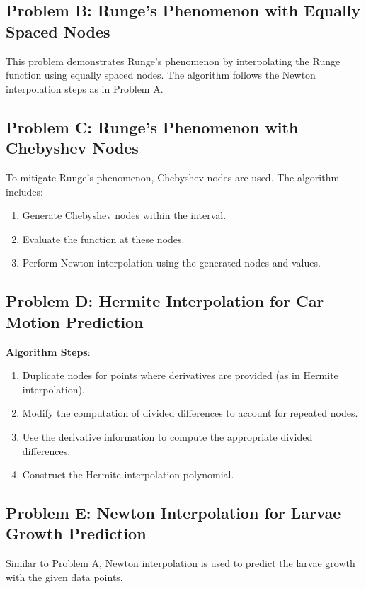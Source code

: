 \documentclass{article}
\begin{document}
\subsection{Problem B: Runge's Phenomenon with Equally Spaced Nodes}

This problem demonstrates Runge's phenomenon by interpolating the Runge function using equally spaced nodes. The algorithm follows the Newton interpolation steps as in Problem A.

\subsection{Problem C: Runge's Phenomenon with Chebyshev Nodes}

To mitigate Runge's phenomenon, Chebyshev nodes are used. The algorithm includes:

\begin{enumerate}
    \item Generate Chebyshev nodes within the interval.
    \item Evaluate the function at these nodes.
    \item Perform Newton interpolation using the generated nodes and values.
\end{enumerate}

\subsection{Problem D: Hermite Interpolation for Car Motion Prediction}

\textbf{Algorithm Steps}:

\begin{enumerate}
    \item Duplicate nodes for points where derivatives are provided (as in Hermite interpolation).
    \item Modify the computation of divided differences to account for repeated nodes.
    \item Use the derivative information to compute the appropriate divided differences.
    \item Construct the Hermite interpolation polynomial.
\end{enumerate}

\subsection{Problem E: Newton Interpolation for Larvae Growth Prediction}

Similar to Problem A, Newton interpolation is used to predict the larvae growth with the given data points.
\end{document}
